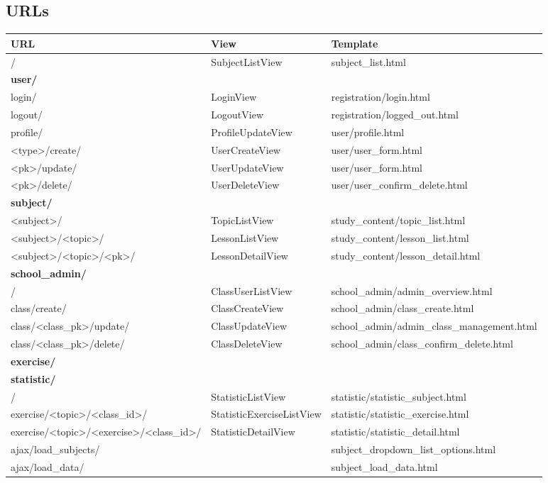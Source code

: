

\subsection{URLs}

\begin{table}[h]
	\centering
	\begin{tabu} to 0.9\textwidth {X X X}
	\toprule
		\textbf{URL} & \textbf{View} & \textbf{Template} \\
	\bottomrule
		/ & SubjectListView & subject\_list.html \\
	\bottomrule
		\textbf{user/} \\
		login/ & LoginView & registration/login.html \\
		logout/ & LogoutView & registration/logged\_out.html \\ 
		profile/ & ProfileUpdateView & user/profile.html \\
		<type>/create/ & UserCreateView & user/user\_form.html \\ 
		<pk>/update/ & UserUpdateView & user/user\_form.html \\
		<pk>/delete/ & UserDeleteView & user/user\_confirm\_delete.html \\
		
		\textbf{subject/} \\
		<subject>/ & TopicListView & study\_content/topic\_list.html \\
		<subject>/<topic>/ & LessonListView & study\_content/lesson\_list.html \\
		<subject>/<topic>/<pk>/ & LessonDetailView & study\_content/lesson\_detail.html \\
		
		\textbf{school\_admin/} \\
		/ & ClassUserListView & school\_admin/admin\_overview.html \\
		class/create/ & ClassCreateView & school\_admin/class\_create.html \\
		class/<class\_pk>/update/ & ClassUpdateView & school\_admin/admin\_class\_management.html \\
		class/<class\_pk>/delete/ & ClassDeleteView & school\_admin/class\_confirm\_delete.html \\
		
		\textbf{exercise/} \\
		
		\textbf{statistic/} \\
		/ & StatisticListView & statistic/statistic\_subject.html \\
		exercise/<topic>/<class\_id>/ & StatisticExerciseListView & statistic/statistic\_exercise.html \\
		exercise/<topic>/<exercise>/<class\_id>/ & StatisticDetailView & statistic/statistic\_detail.html \\
		ajax/load\_subjects/ & & subject\_dropdown\_list\_options.html \\
		ajax/load\_data/ & & subject\_load\_data.html \\
		

\end{tabu}
\end{table}
